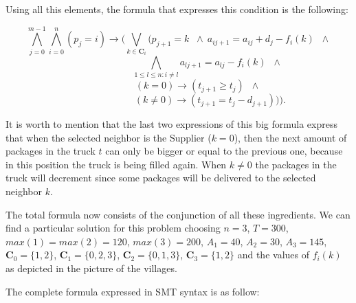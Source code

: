 \documentclass[a4paper]{article}
\begin{document}
Using all this elements, the formula that expresses this condition is the following:

\[\bigwedge_{j=0}^{m-1} \bigwedge_{i=0}^n (p_j = i) \rightarrow (\bigvee_{k \in \textbf{C}_i} (p_{j+1}=k \;\;\wedge\ a_{ij+1} = a_{ij} + d_{j} - f_i(k) \;\;\wedge\]
\[\qquad \qquad \qquad \bigwedge_{1\leq l \leq n:i\neq l} a_{lj+1} = a_{lj} - f_i(k) \;\;\wedge\]
\[\qquad \qquad(k=0) \rightarrow (t_{j+1} \geq t_j) \;\;\wedge\]
\[\qquad \qquad \qquad \; \;(k\neq0) \rightarrow (t_{j+1} = t_j - d_{j+1}) )).\]

It is worth to mention that the last two expressions of this big formula express that when the selected neighbor is the Supplier ($k=0$), then the next amount of packages in the truck $t$ can only be bigger or equal to the previous one, because in this position the truck is being filled again. When $k \neq 0$ the packages in the truck will decrement since some packages will be delivered to the selected neighbor $k$.

The total formula now consists of the conjunction of all these ingredients. We can find a particular solution for this problem choosing $n = 3$, $T = 300$, $max(1) = max(2) = 120$, $max(3) = 200$, $A_1 = 40$, $A_2 = 30$, $A_3 = 145$, $\textbf{C}_0 = \{1,2\}$, $\textbf{C}_1 = \{0,2,3\}$, $\textbf{C}_2 = \{0,1,3\}$, $\textbf{C}_3 = \{1,2\}$ and the values of $f_i(k)$ as depicted in the picture of the villages.

The complete formula expressed in SMT syntax is as follow:

\vspace{3mm}
\end{document}
